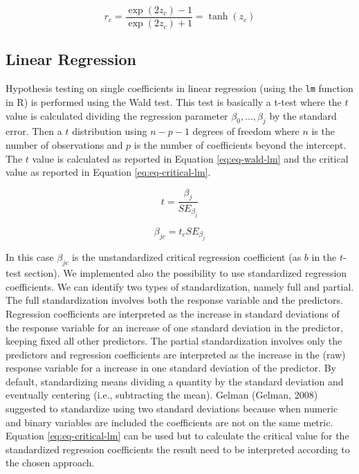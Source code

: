\documentclass[
  man]{apa7}
\begin{document}
\begin{equation}
    \label{eq:eq-bk-r}
    r_c = \frac{\exp(2z_c)-1}{\exp(2z_c)+1} = \operatorname{tanh}(z_c)
\end{equation}

\hypertarget{linear-regression}{%
\subsection{Linear Regression}\label{linear-regression}}

Hypothesis testing on single coefficients in linear regression (using the \texttt{lm} function in R) is performed using the Wald test. This test is basically a t-test where the \(t\) value is calculated dividing the regression parameter \(\beta_0, \dots, \beta_j\) by the standard error. Then a \(t\) distribution using \(n - p - 1\) degrees of freedom where \(n\) is the number of observations and \(p\) is the number of coefficients beyond the intercept. The \(t\) value is calculated as reported in Equation \eqref{eq:eq-wald-lm} and the critical value as reported in Equation \eqref{eq:eq-critical-lm}.

\begin{equation}
\label{eq:eq-wald-lm}
    t = \frac{\beta_j}{SE_{\beta_j}}
\end{equation}

\begin{equation}
\label{eq:eq-critical-lm}
    \beta_{jc} = t_c SE_{\beta_j}
\end{equation}

In this case \(\beta_{jc}\) is the unstandardized critical regression coefficient (as \(b\) in the \(t\)-test section). We implemented also the possibility to use standardized regression coefficients. We can identify two types of standardization, namely full and partial. The full standardization involves both the response variable and the predictors. Regression coefficients are interpreted as the increase in standard deviations of the response variable for an increase of one standard deviation in the predictor, keeping fixed all other predictors. The partial standardization involves only the predictors and regression coefficients are interpreted as the increase in the (raw) response variable for a increase in one standard deviation of the predictor. By default, standardizing means dividing a quantity by the standard deviation and eventually centering (i.e., subtracting the mean). Gelman (Gelman, 2008) suggested to standardize using two standard deviations because when numeric and binary variables are included the coefficients are not on the same metric. Equation \eqref{eq:eq-critical-lm} can be used but to calculate the critical value for the standardized regression coefficients the result need to be interpreted according to the chosen approach.
\end{document}
